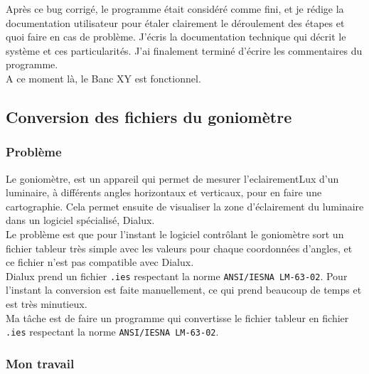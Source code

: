 \documentclass[12pt]{article}
\begin{document}
Après ce bug corrigé, le programme était considéré comme fini, et je rédige la documentation utilisateur pour étaler clairement le déroulement des étapes et quoi faire en cas de problème.
J'écris la documentation technique qui décrit le système et ces particularités.
J'ai finalement terminé d'écrire les commentaires du programme.\\
A ce moment là, le Banc XY est fonctionnel.

\newpage
\subsection{Conversion des fichiers du goniomètre }

\subsubsection{Problème}

Le goniomètre, est un appareil qui permet de mesurer l'\gls{eclairementLux} d'un luminaire, à différents angles horizontaux et verticaux, pour en faire une cartographie.
Cela permet ensuite de visualiser la zone d'éclairement du luminaire dans un logiciel spécialisé, Dialux.\\
Le problème est que pour l'instant le logiciel contrôlant le goniomètre sort un fichier tableur très simple avec les valeurs pour chaque coordonnées d'angles, et ce fichier n'est pas compatible avec Dialux.\\
Dialux prend un fichier \verb|.ies| respectant la norme \verb|ANSI/IESNA LM-63-02|.
Pour l'instant la conversion est faite manuellement, ce qui prend beaucoup de temps et est très minutieux.\\
Ma tâche est de faire un programme qui convertisse le fichier tableur en fichier \verb|.ies| respectant la norme \verb|ANSI/IESNA LM-63-02|.


\subsubsection{ Mon travail  }
\end{document}
